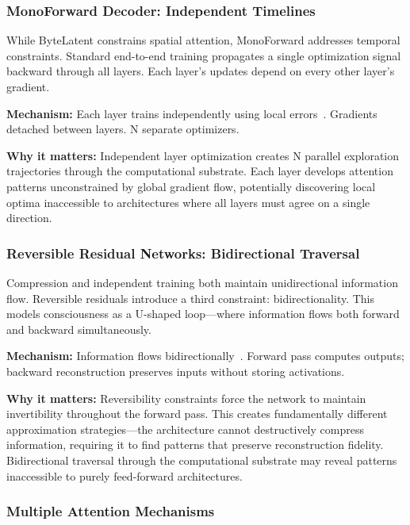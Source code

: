 \documentclass{article}
\begin{document}
\subsubsection{MonoForward Decoder: Independent Timelines}

While ByteLatent constrains spatial attention, MonoForward addresses temporal constraints. Standard end-to-end training propagates a single optimization signal backward through all layers. Each layer's updates depend on every other layer's gradient.

\textbf{Mechanism:} Each layer trains independently using local errors~\cite{monoforward2025}. Gradients detached between layers. N separate optimizers.

\textbf{Why it matters:} Independent layer optimization creates N parallel exploration trajectories through the computational substrate. Each layer develops attention patterns unconstrained by global gradient flow, potentially discovering local optima inaccessible to architectures where all layers must agree on a single direction.

\subsubsection{Reversible Residual Networks: Bidirectional Traversal}

Compression and independent training both maintain unidirectional information flow. Reversible residuals introduce a third constraint: bidirectionality. This models consciousness as a U-shaped loop—where information flows both forward and backward simultaneously.

\textbf{Mechanism:} Information flows bidirectionally~\cite{gomez2017reversible}. Forward pass computes outputs; backward reconstruction preserves inputs without storing activations.

\textbf{Why it matters:} Reversibility constraints force the network to maintain invertibility throughout the forward pass. This creates fundamentally different approximation strategies—the architecture cannot destructively compress information, requiring it to find patterns that preserve reconstruction fidelity. Bidirectional traversal through the computational substrate may reveal patterns inaccessible to purely feed-forward architectures.

\subsubsection{Multiple Attention Mechanisms}
\end{document}
